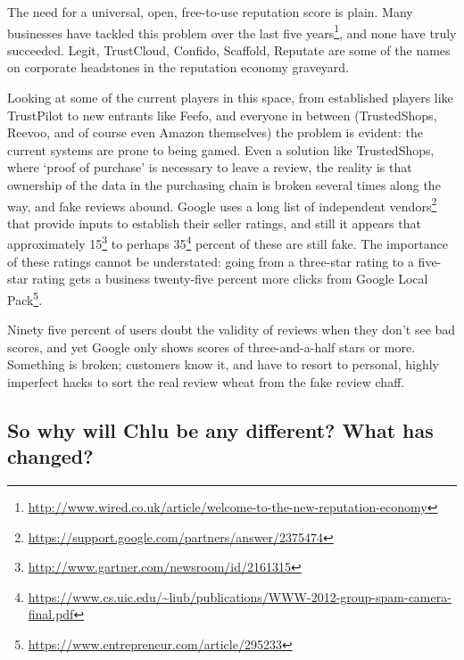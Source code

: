 \documentclass[a4paper]{article}
\begin{document}

The need for a universal, open, free-to-use reputation score is
plain. Many businesses have tackled this problem over the last five
years\footnote{\url{http://www.wired.co.uk/article/welcome-to-the-new-reputation-economy}},
and none have truly succeeded. Legit, TrustCloud, Confido, Scaffold,
Reputate are some of the names on corporate headstones in the
reputation economy graveyard.
 
Looking at some of the current players in this space, from established
players like TrustPilot to new entrants like Feefo, and everyone in
between (TrustedShops, Reevoo, and of course even Amazon themselves)
the problem is evident: the current systems are prone to being
gamed. Even a solution like TrustedShops, where `proof of purchase' is
necessary to leave a review, the reality is that ownership of the data
in the purchasing chain is broken several times along the way, and
fake reviews abound. Google uses a long list of independent
vendors\footnote{\url{https://support.google.com/partners/answer/2375474}}
that provide inputs to establish their seller ratings, and still it
appears that approximately
15\footnote{\url{http://www.gartner.com/newsroom/id/2161315}} to
perhaps
35\footnote{\url{https://www.cs.uic.edu/~liub/publications/WWW-2012-group-spam-camera-final.pdf}}
percent of these are still fake. The importance of these ratings
cannot be understated: going from a three-star rating to a five-star
rating gets a business twenty-five percent more clicks from Google
Local
Pack\footnote{\url{https://www.entrepreneur.com/article/295233}}.

Ninety five percent of users doubt the validity of reviews when they
don't see bad scores, and yet Google only shows scores of
three-and-a-half stars or more. Something is broken; customers know
it, and have to resort to personal, highly imperfect hacks to sort the
real review wheat from the fake review chaff.
 
\subsection{So why will Chlu be any different? What has changed?}
\end{document}
